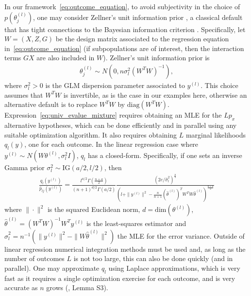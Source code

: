 \documentclass[pdflatex,sn-mathphys-num]{sn-jnl}%
\theoremstyle{thmstyleone}%
\theoremstyle{thmstyletwo}%
\theoremstyle{thmstylethree}%
\begin{document}
In our framework~\eqref{eq:outcome_equation}, to avoid subjectivity in the choice of $p(\theta_j^{(l)})$, one may consider Zellner's unit information prior \citep{zellner:1986}, a classical default that has tight connections to the Bayesian information criterion \citep{schwarz:1978}.
Specifically, let $W=(X, Z, G)$ be the design matrix associated to the regression equation in~\eqref{eq:outcome_equation} (if subpopulations are of interest, then the interaction terms $GX$ are also included in $W$).
Zellner's unit information prior is
\begin{align}
\theta_j^{(l)} \sim N(0, n \sigma_l^2 (W^T W)^{-1}),
\label{eq:uip}
\end{align}
where $\sigma_l^2 > 0$ is the GLM dispersion parameter associated to $y^{(l)}$.
This choice assumes that $W^T W$ is invertible, as is the case in our examples here, otherwise an alternative default is to replace $W^TW$ by $\mbox{diag}(W^T W)$. Expression~\eqref{eq:univ_evalue_mixture} requires obtaining an MLE for the $L p_x$ alternative hypotheses, which can be done efficiently and in parallel using any suitable optimization algorithm.
It also requires obtaining $L$ marginal likelihoods $q_l(y)$, one for each outcome.
In the linear regression case where $y^{(l)} \sim N(W \theta^{(l)}, \sigma_l^2 I)$, $q_l$ has a closed-form.
Specifically, if one sets an inverse Gamma prior $\sigma_l^2 \sim \mbox{IG}(a/2,l/2)$, then
\begin{align}
 \frac{q_l(y^{(l)})}{\hat{p}_{lj}(y^{(l)})}= 
\frac{l^{a/2} \Gamma(\frac{n+a}{2})}{(n + 1)^{d/2} \Gamma(a/2)}
\frac{(2 e/\hat{\sigma}_l^2)^{\frac{n}{2}}}{\left( l+ \| y^{(l)} \|^2 - \frac{n}{n+1} (\hat{\theta}^{(l)})^T W^T W \hat{\theta}^{(l)} \right)^{\frac{n + a}{2}}}
\nonumber
\end{align}
where $\| \cdot \|^2$ is the squared Euclidean norm, $d=\mbox{dim}(\theta^{(l)})$, $\hat{\theta}^{(l)}= (W^T W)^{-1} W^T y^{(l)}$ is the least-squares estimator and $\hat{\sigma}_l^2= n^{-1}(\| y^{(l)} \|^2 - \| W \hat{\theta}^{(l)} \|^2)$ the MLE for the error variance.
Outside of linear regression numerical integration methods must be used and, as long as the number of outcomes $L$ is not too large, this can also be done quickly (and in parallel).
One may approximate $q_l$ using Laplace approximations, which is very fast as it requires a single optimization exercise for each outcome, and is very accurate as $n$ grows (\cite{kass:1990}, \cite{rossell:2021b} Lemma S3).
\end{document}
